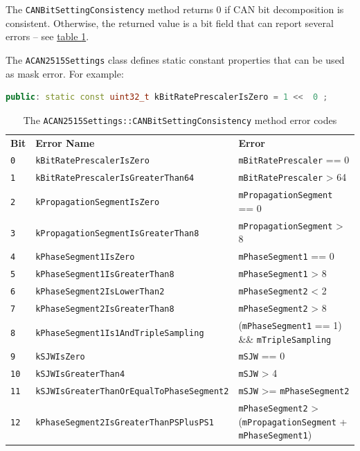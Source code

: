 \documentclass[10pt, a4paper, obeyspaces]{extarticle}
\newcommand\labelTableau[1]{\label{tab:#1}}
\newcommand\refTableau[1]{\hyperref[tab:#1]{table \ref*{tab:#1}}}
\begin{document}
The \texttt{CANBitSettingConsistency} method returns $0$ if CAN bit decomposition is consistent. Otherwise, the returned value is a bit field that can report several errors -- see \refTableau{CANBitSettingConsistencyErrorCode}.


The \texttt{ACAN2515Settings} class defines static constant properties that can be used as mask error. For example:
{ \small\begin{lstlisting}[language=c++]
public: static const uint32_t kBitRatePrescalerIsZero = 1 <<  0 ;
\end{lstlisting}}

\begin{table}[!ht]
  \newcommand\zero{\texttt{0}}
  \newcommand\X{\texttt{x}}
  \small
  \onehalfspacing
  \centering
  \begin{tabular}{lll}
    \textbf{Bit} & \textbf{Error Name} & \textbf{Error}\\
    \texttt{0} & \texttt{kBitRatePrescalerIsZero} & \texttt{mBitRatePrescaler} == 0\\
    \texttt{1} & \texttt{kBitRatePrescalerIsGreaterThan64} & \texttt{mBitRatePrescaler} > 64\\
    \texttt{2} & \texttt{kPropagationSegmentIsZero} & \texttt{mPropagationSegment} == 0\\
    \texttt{3} & \texttt{kPropagationSegmentIsGreaterThan8} & \texttt{mPropagationSegment} > 8\\
    \texttt{4} & \texttt{kPhaseSegment1IsZero} & \texttt{mPhaseSegment1} == 0\\
    \texttt{5} & \texttt{kPhaseSegment1IsGreaterThan8} & \texttt{mPhaseSegment1} > 8\\
    \texttt{6} & \texttt{kPhaseSegment2IsLowerThan2} & \texttt{mPhaseSegment2} < 2\\
    \texttt{7} & \texttt{kPhaseSegment2IsGreaterThan8} & \texttt{mPhaseSegment2} > 8\\
    \texttt{8} & \texttt{kPhaseSegment1Is1AndTripleSampling} & (\texttt{mPhaseSegment1} == 1) \&\& \texttt{mTripleSampling}\\
    \texttt{9} & \texttt{kSJWIsZero} & \texttt{mSJW} == 0\\
    \texttt{10} & \texttt{kSJWIsGreaterThan4} & \texttt{mSJW} > 4\\
    \texttt{11} & \texttt{kSJWIsGreaterThanOrEqualToPhaseSegment2} & \texttt{mSJW} >= \texttt{mPhaseSegment2}\\
    \texttt{12} & \texttt{kPhaseSegment2IsGreaterThanPSPlusPS1} & \texttt{mPhaseSegment2} > (\texttt{mPropagationSegment} + \texttt{mPhaseSegment1})\\
  \end{tabular}
  \caption{The \texttt{ACAN2515Settings::CANBitSettingConsistency} method error codes}
  \labelTableau{CANBitSettingConsistencyErrorCode}
\end{table}
\end{document}
